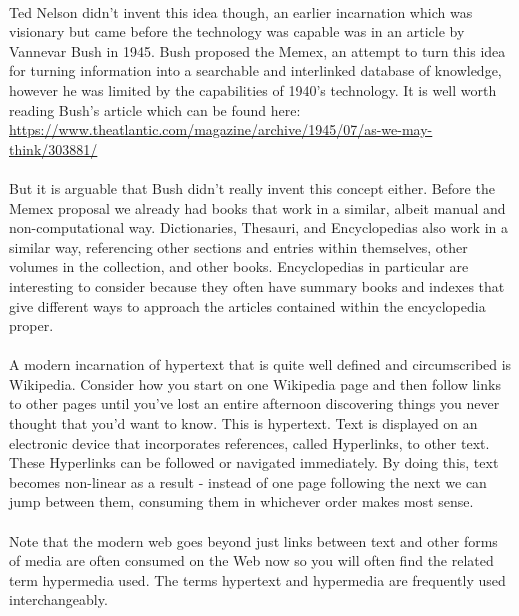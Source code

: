 \paragraph{} Ted Nelson didn't invent this idea though, an earlier incarnation which was visionary but came before the technology was capable was in an article by Vannevar Bush in 1945. Bush proposed the Memex, an attempt to turn this idea for turning information into a searchable and interlinked database of knowledge, however he was limited by the capabilities of 1940's technology. It is well worth reading Bush's article which can be found here:
	\url{https://www.theatlantic.com/magazine/archive/1945/07/as-we-may-think/303881/}

\paragraph{} But it is arguable that Bush didn't really invent this concept either. Before the Memex proposal we already had books that work in a similar, albeit manual and non-computational way. Dictionaries, Thesauri, and Encyclopedias also work in a similar way, referencing other sections and entries within themselves, other volumes in the collection, and other books. Encyclopedias in particular are interesting to consider because they often have summary books and indexes that give different ways to approach the articles contained within the encyclopedia proper.
\paragraph{} A modern incarnation of hypertext that is quite well defined and circumscribed is Wikipedia. Consider how you start on one Wikipedia page and then follow links to other pages until you've lost an entire afternoon discovering things you never thought that you'd want to know. This is hypertext. Text is displayed on an electronic device that incorporates references, called Hyperlinks, to other text. These Hyperlinks can be followed or navigated immediately. By doing this, text becomes non-linear as a result - instead of one page following the next we can jump between them, consuming them in whichever order makes most sense. 
\paragraph{} Note that the modern web goes beyond just links between text and other forms of media are often consumed on the Web now so you will often find the related term hypermedia used. The terms hypertext and hypermedia are frequently used interchangeably.
